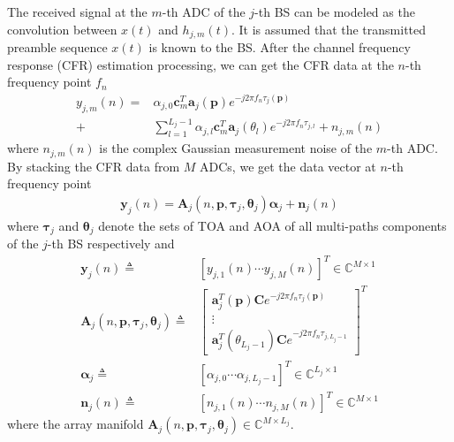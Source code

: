 \documentclass[journal]{IEEEtran}
\begin{document}
The received signal at the $m$-th ADC of the $j$-th BS can be modeled as the convolution between $x(t)$ and $h_{j,m}(t)$. It is assumed that the transmitted preamble sequence $x(t)$ is known to the BS. After the channel frequency response (CFR) estimation processing, we can get the CFR data at the $n$-th frequency point $f_n$
\begin{align}\label{CFR}
  y_{j,m}(n)=&\alpha_{j,0}\boldsymbol{c}_m^T\boldsymbol{a}_j(\boldsymbol{p})e^{-j2\pi f_n \tau_j(\boldsymbol{p})}\\\nonumber
  +&\sum_{l=1}^{L_j-1}\alpha_{j,l}\boldsymbol{c}_m^T\boldsymbol{a}_j(\theta_l)e^{-j2\pi f_n \tau_{j,l}}+n_{j,m}(n)
\end{align} 
where $n_{j,m}(n)$ is the complex Gaussian measurement noise of the $m$-th ADC. By stacking the CFR data from $M$ ADCs, we get the data vector at $n$-th frequency point
\begin{align}\label{CFR_M0}
  \boldsymbol{y}_j(n)=\boldsymbol{A}_j(n,\boldsymbol{p},\boldsymbol{\tau}_j,\boldsymbol{\theta}_j)\boldsymbol{\alpha}_j+\boldsymbol{n}_j(n)
\end{align} 
where $\boldsymbol{\tau}_j$ and $\boldsymbol{\theta}_j$ denote the sets of TOA and AOA of all multi-paths components of the $j$-th BS respectively and
\begin{align}\label{CFR_M1}
  \boldsymbol{y}_j(n)\triangleq& [y_{j,1}(n)\cdots y_{j,M}(n)]^T \in \mathbb{C}^{M \times 1}\\ \nonumber
  \boldsymbol{A}_j(n,\boldsymbol{p},\boldsymbol{\tau}_j,\boldsymbol{\theta}_j)\triangleq&\left[
  \begin{array}{c}
    \boldsymbol{a}_j^T(\boldsymbol{p})\boldsymbol{C}e^{-j2\pi f_n \tau_j(\boldsymbol{p})}\\
     \vdots \\
     \boldsymbol{a}_j^T(\theta_{L_j-1})\boldsymbol{C}e^{-j2\pi f_n \tau_{j,L_j-1}}
  \end{array}\right]^T\\ \nonumber
  \boldsymbol{\alpha}_j\triangleq& [\alpha_{j,0}\cdots \alpha_{j,L_j-1}]^T\in \mathbb{C}^{L_j\times 1}\\ \nonumber
  \boldsymbol{n}_j(n)\triangleq& [n_{j,1}(n)\cdots n_{j,M}(n)]^T\in \mathbb{C}^{M \times 1}
\end{align}
where the array manifold $\boldsymbol{A}_j(n,\boldsymbol{p},\boldsymbol{\tau}_j,\boldsymbol{\theta}_j)\in \mathbb{C}^{M\times L_j}$.
\end{document}
